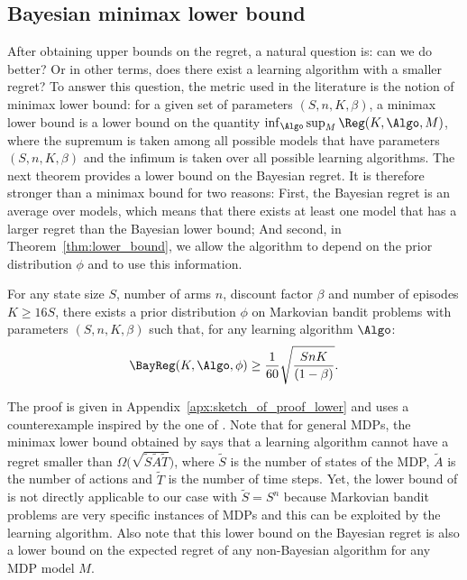 \subsection{Bayesian minimax lower bound}
\label{ssec:lowerbound}

After obtaining upper bounds on the regret, a natural question is: can we do better? Or in other terms, does there exist a learning algorithm with a smaller regret? To answer this question, the metric used in the literature is the notion of minimax lower bound: for a given set of parameters $(S,n,K,\beta)$, a minimax lower bound is a lower bound on the quantity 
$\inf_{\Algo}\sup_{M}\Reg(K,\Algo,M)$,  where the supremum is taken among all possible models that have parameters $(S,n,K,\beta)$ and the infimum is taken over all possible learning algorithms. The next theorem provides a lower bound on the Bayesian regret. It is therefore stronger than a minimax bound for two reasons: First, the Bayesian regret is an average over models, which means that there exists at least one model that has a larger regret than the Bayesian lower bound; And second,  in Theorem~\ref{thm:lower_bound}, we allow the algorithm to depend on the prior distribution $\phi$ and to use this information.
\begin{thm}
    \label{thm:lower_bound}
    For any state size $S$, number of arms $n$, discount factor $\beta$ and number of episodes $K\ge 16S$, there exists a prior distribution $\phi$ on Markovian bandit problems with parameters $(S,n,K,\beta)$ such that, for any learning algorithm $\Algo$:
    \begin{align}
        \label{eq:thm2}
        \BayReg(K,\Algo,\phi) \geq \frac1{60}\sqrt{\frac{{SnK}}{(1-\beta)}}.
    \end{align}
\end{thm}
The proof is given in Appendix~\ref{apx:sketch_of_proof_lower} and uses a counterexample inspired by the one of \cite{jaksch2010near}. Note that for general MDPs, the minimax lower bound  obtained by \cite{osband2016lower,jaksch2010near} says that a learning algorithm cannot have a regret smaller than $\Omega\big(\sqrt{\tilde{S}\tilde{A}\tilde{T}}\big)$, where $\tilde{S}$ is the number of states of the MDP, $\tilde{A}$ is the number of actions and $\tilde{T}$ is the number of time steps. 
Yet, the lower bound of \cite{osband2016lower,jaksch2010near} is not  directly applicable to our case with $\tilde{S}=S^n$ because Markovian bandit problems are very specific instances of MDPs and this can be exploited by the  learning algorithm.
Also note that this lower bound on the Bayesian regret is also a lower bound on the expected regret of any non-Bayesian algorithm for any MDP model $M$.

